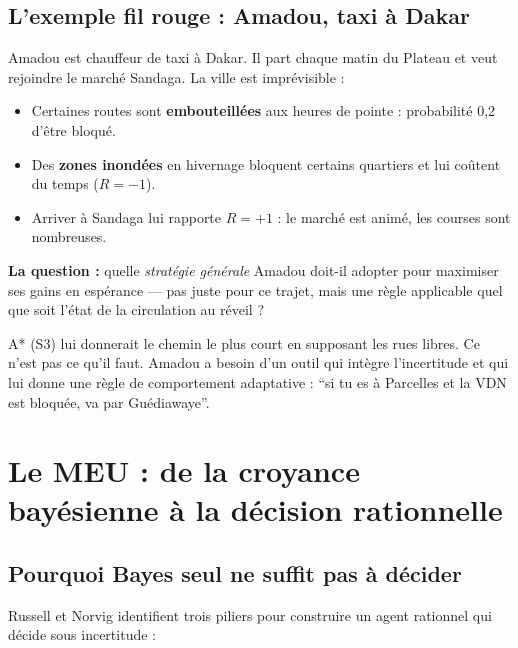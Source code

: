 \documentclass[11pt,a4paper]{article}
\begin{document}
\subsection{L'exemple fil rouge : Amadou, taxi à Dakar}

\begin{exemplebox}
Amadou est chauffeur de taxi à Dakar. Il part chaque matin du Plateau et veut rejoindre le marché Sandaga. La ville est imprévisible :
\begin{itemize}[nosep]
    \item Certaines routes sont \textbf{embouteillées} aux heures de pointe : probabilité 0,2 d'être bloqué.
    \item Des \textbf{zones inondées} en hivernage bloquent certains quartiers et lui coûtent du temps ($R = -1$).
    \item Arriver à Sandaga lui rapporte $R = +1$ : le marché est animé, les courses sont nombreuses.
\end{itemize}

\textbf{La question :} quelle \textit{stratégie générale} Amadou doit-il adopter pour maximiser ses gains en espérance --- pas juste pour ce trajet, mais une règle applicable quel que soit l'état de la circulation au réveil ?
\end{exemplebox}

A* (S3) lui donnerait le chemin le plus court en supposant les rues libres. Ce n'est pas ce qu'il faut. Amadou a besoin d'un outil qui intègre l'incertitude et qui lui donne une règle de comportement adaptative : ``si tu es à Parcelles et la VDN est bloquée, va par Guédiawaye''.

\section{Le MEU : de la croyance bayésienne à la décision rationnelle}
\label{sec:meu}

\subsection{Pourquoi Bayes seul ne suffit pas à décider}

Russell et Norvig identifient trois piliers pour construire un agent rationnel qui décide sous incertitude :
\end{document}
